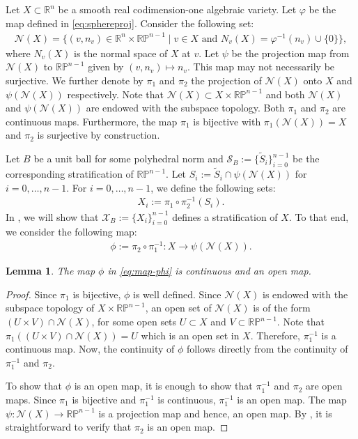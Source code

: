 \documentclass{article}
\numberwithin{theorem}{section}
\newtheorem{lemma}[theorem]{Lemma}
\theoremstyle{definition}
\theoremstyle{example_contd}
\newcommand{\N}{\mathcal{N}}
\newcommand{\RR}{\mathbb{R}}
\newcommand{\PP}{{\mathbb{P}}}
\newcommand{\Rp}{{\mathbb{RP}}}
\renewcommand{\S}{\mathcal{S}}
\begin{document}
Let $X \subset \RR^n$ be a smooth real codimension-one algebraic variety. Let $\varphi$ be the map defined in \eqref{eq:sphereproj}. Consider the following set:
\begin{align*}
\mathcal{N}(X)=\{(v,n_v)\in \RR^n\times \RR\PP^{n-1} \mid v\in X \text{ and } N_v(X)=\varphi^{-1}(n_v)\cup \{0\}\},
\end{align*}
where $N_v(X)$ is the normal space of $X$ at $v$. Let $\psi$ be the projection map from $\N(X)$ to $\Rp^{n-1}$ given by $(v,n_v)\mapsto n_v.$ This map may not necessarily be surjective. We further denote by $\pi_1$ and $\pi_2$ the projection of $\N(X)$ onto $X$ and $ \psi(\N(X))$ respectively. Note that $\N(X)\subset X\times \RR\PP^{n-1}$ and both $\N(X)$ and $\psi(\N(X))$ are endowed with the subspace topology. Both $\pi_1$ and $\pi_2$ are continuous maps. Furthermore, the map $\pi_1$ is bijective with $\pi_1(\N(X))=X$ and $\pi_2$ is surjective by construction. 

Let $B$ be a unit ball for some polyhedral norm and  $\S_B:=\{\tilde{S}_i\}_{i=0}^{n-1}$ be the corresponding stratification of $\Rp^{n-1}.$ Let $S_i:=\tilde{S}_i\cap \psi(\N(X))$ for $i=0,\ldots, n-1$. For $i = 0,\ldots, n-1$,  we define the following sets: 
\begin{align}\label{eq:def-Xi}
	X_i:=\pi_1\circ \pi_2^{-1}(S_i).
\end{align}
In , we will show that $\mathcal{X}_B:=\{X_i\}_{i=0}^{n-1}$ defines a stratification of $X.$ To that end, we consider the following map:
\begin{align}\label{eq:map-phi}
	\phi:=\pi_2\circ \pi_1^{-1}:X\to \psi(\N(X)).
\end{align}

\begin{lemma}\label{lem:composedmap}
	The map $\phi$ in \eqref{eq:map-phi} is continuous and an open map.
\end{lemma}

\begin{proof}
    Since $\pi_1$ is bijective, $\phi$ is well defined. 
    Since $\N(X)$ is endowed with the subspace topology of $X\times \Rp^{n-1}$, an open set of $\N(X)$ is of the form $(U\times V)\cap \N(X)$, for some open sets $U\subset X$ and $V\subset \Rp^{n-1}$.
    Note that $\pi_1((U\times V)\cap\N(X))=U$ which is an open set in $X$. Therefore, $\pi_1^{-1}$ is a continuous map. Now, the continuity of $\phi$ follows directly from the continuity of $\pi_1^{-1}$ and $\pi_2$. 
	
	To show that $\phi$ is an open map, it is enough to show that $\pi_1^{-1}$ and $\pi_2$ are open maps. Since $\pi_1$ is bijective and $\pi_1^{-1}$ is continuous, $\pi_1^{-1}$ is an open map. 
	The map $\psi:\N(X)\to \Rp^{n-1}$ is a projection map and hence, an open map. By , it is straightforward to verify that $\pi_2$ is an open map. 
\end{proof}
\end{document}
